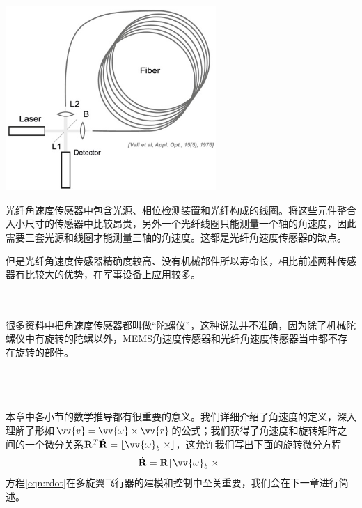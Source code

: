 \documentclass[11pt]{article}
\begin{document}
\begin{center}
\includegraphics[width=0.6\textwidth]{images/sagnaceffect.jpg}
\end{center}

光纤角速度传感器中包含光源、相位检测装置和光纤构成的线圈。将这些元件整合入小尺寸的传感器中比较昂贵，另外一个光纤线圈只能测量一个轴的角速度，因此需要三套光源和线圈才能测量三轴的角速度。这都是光纤角速度传感器的缺点。

但是光纤角速度传感器精确度较高、没有机械部件所以寿命长，相比前述两种传感器有比较大的优势，在军事设备上应用较多。

\ \\
\ \\

很多资料中把角速度传感器都叫做“陀螺仪”，这种说法并不准确，因为除了机械陀螺仪中有旋转的陀螺以外，MEMS角速度传感器和光纤角速度传感器当中都不存在旋转的部件。

\ \\
\ \\
\ \\

本章中各小节的数学推导都有很重要的意义。我们详细介绍了角速度的定义，深入理解了形如$\vv{v} = \vv{\omega} \times \vv{r}$的公式；我们获得了角速度和旋转矩阵之间的一个微分关系${\bf R}^T\dot{{\bf R}} = \lfloor \vv{\omega}_b \ \times \rfloor$，这允许我们写出下面的旋转微分方程
\begin{equation}\label{eqn:rdot}
\dot{{\bf R}} = {\bf R}\lfloor \vv{\omega}_b \ \times \rfloor
\end{equation}
方程\ref{eqn:rdot}在多旋翼飞行器的建模和控制中至关重要，我们会在下一章进行简述。
\end{document}

